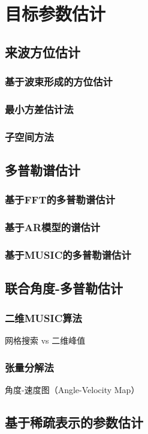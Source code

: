\chapter{目标参数估计}

\section{来波方位估计}

\subsection{基于波束形成的方位估计}
\subsection{最小方差估计法}
\subsection{子空间方法}

\section{多普勒谱估计}
\subsection{基于FFT的多普勒谱估计}
\subsection{基于AR模型的谱估计}
\subsection{基于MUSIC的多普勒谱估计}

\section{联合角度-多普勒估计}
\subsection{二维MUSIC算法}
网格搜索 vs 二维峰值
\subsection{张量分解法}
角度-速度图（Angle-Velocity Map）

\section{基于稀疏表示的参数估计}
